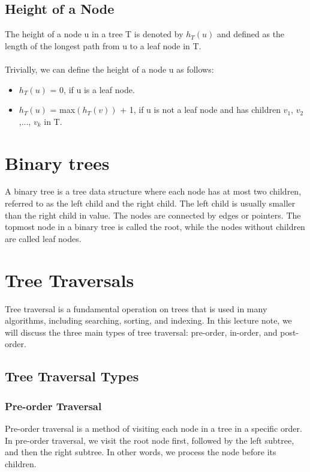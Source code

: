 \documentclass[a4paper, 11pt, oneside]{book} %
\begin{document}
\subsection{Height of a Node}
The height of a node u in a tree T is denoted by $h_T(u)$ and defined as the length of the longest path from u to a leaf node in T.
\\
\\
Trivially, we can define the height of a node u as follows:
\begin{itemize}
    \item $h_T(u)$ = 0, if u is a leaf node.
    \item $h_T(u)$ = max$(h_T(v))$ + 1, if u is not a leaf node and has children $v_1$, $v_2$,..., $v_k$ in T.
\end{itemize}


\section{Binary trees}
 A binary tree is a tree data structure where each node has at most two children, referred to as the left child and the right child. The left child is usually smaller than the right child in value. The nodes are connected by edges or pointers. The topmost node in a binary tree is called the root, while the nodes without children are called leaf nodes.

\section{Tree Traversals}
Tree traversal is a fundamental operation on trees that is used in many algorithms, including searching, sorting, and indexing. In this lecture note, we will discuss the three main types of tree traversal: pre-order, in-order, and post-order. 

\subsection{Tree Traversal Types}
\subsubsection{Pre-order Traversal}

Pre-order traversal is a method of visiting each node in a tree in a specific order. In pre-order traversal, we visit the root node first, followed by the left subtree, and then the right subtree. In other words, we process the node before its children.
\end{document}
